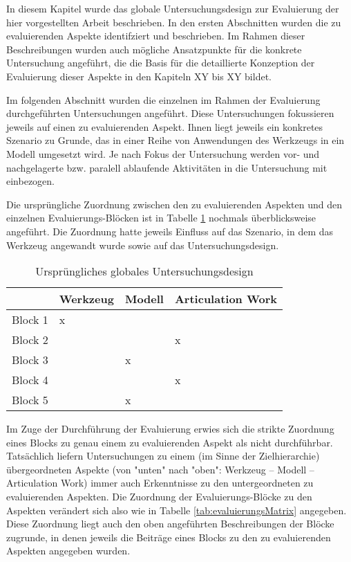 In diesem Kapitel wurde das globale Untersuchungsdesign zur Evaluierung der hier vorgestellten Arbeit beschrieben. In den ersten Abschnitten wurden die zu evaluierenden Aspekte identifziert und beschrieben. Im Rahmen dieser Beschreibungen wurden auch mögliche Ansatzpunkte für die konkrete Untersuchung angeführt, die die Basis für die detaillierte Konzeption der Evaluierung dieser Aspekte in den Kapiteln XY bis XY bildet. 

Im folgenden Abschnitt wurden die einzelnen im Rahmen der Evaluierung durchgeführten Untersuchungen angeführt. Diese Untersuchungen fokussieren jeweils auf einen zu evaluierenden Aspekt. Ihnen liegt jeweils ein konkretes Szenario zu Grunde, das in einer Reihe von Anwendungen des Werkzeugs in ein Modell umgesetzt wird. Je nach Fokus der Untersuchung werden vor- und nachgelagerte bzw. paralell ablaufende Aktivitäten in die Untersuchung mit einbezogen.

Die ursprüngliche Zuordnung zwischen den zu evaluierenden Aspekten und den einzelnen Evaluierungs-Blöcken ist in Tabelle \ref{tab:evaluierungsMatrixOriginal} nochmals überblicksweise angeführt. Die Zuordnung hatte jeweils Einfluss auf das Szenario, in dem das Werkzeug angewandt wurde sowie auf das Untersuchungsdesign.

\begin{table}[htbp]
	\centering
	\caption{Ursprüngliches globales Untersuchungsdesign}
	\begin{tabular}{| p{3cm} || p{2cm} | p{2cm} | p{2cm} |} \hline
		 & Werkzeug & Modell & Articulation Work \\ \hline \hline
		 Block 1 & x &  &   \\ \hline
		 Block 2 &  &  & x  \\ \hline
		 Block 3 &  & x &   \\ \hline
		 Block 4 &  &  & x  \\ \hline
		 Block 5 &  & x &   \\ \hline
	\end{tabular}
	\label{tab:evaluierungsMatrixOriginal}
\end{table}

Im Zuge der Durchführung der Evaluierung erwies sich die strikte Zuordnung eines Blocks zu genau einem zu evaluierenden Aspekt als nicht durchführbar. Tatsächlich liefern Untersuchungen zu einem (im Sinne der Zielhierarchie) übergeordneten Aspekte (von "unten" nach "oben": Werkzeug -- Modell -- Articulation Work) immer auch Erkenntnisse zu den untergeordneten zu evaluierenden Aspekten. Die Zuordnung der Evaluierungs-Blöcke zu den Aspekten verändert sich also wie in Tabelle \ref{tab:evaluierungsMatrix} angegeben. Diese Zuordnung liegt auch den oben angeführten Beschreibungen der Blöcke zugrunde, in denen jeweils die Beiträge eines Blocks zu den zu evaluierenden Aspekten angegeben wurden.

